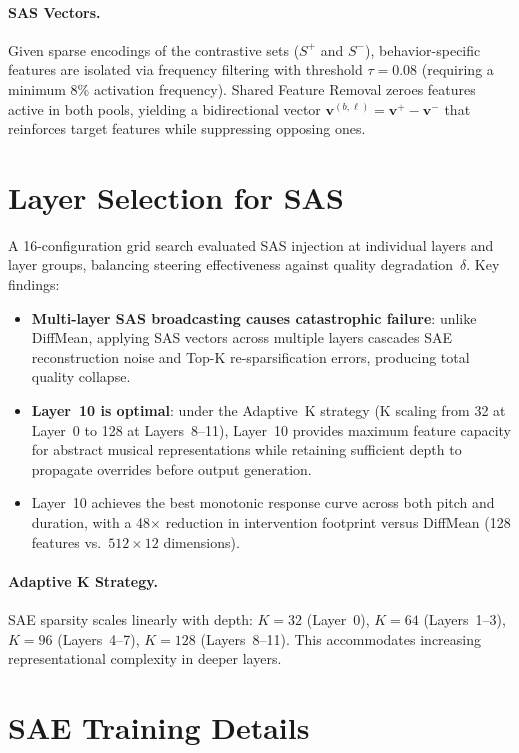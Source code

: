 \documentclass{article}
\theoremstyle{plain}
\begin{document}
\paragraph{SAS Vectors.}
Given sparse encodings of the contrastive sets ($S^+$ and $S^-$), behavior-specific features are isolated via frequency filtering with threshold $\tau{=}0.08$ (requiring a minimum 8\% activation frequency). Shared Feature Removal zeroes features active in both pools, yielding a bidirectional vector $\mathbf{v}^{(b,\ell)} = \mathbf{v}^{+} - \mathbf{v}^{-}$ that reinforces target features while suppressing opposing ones.

\section{Layer Selection for SAS}
\label{app:layer_selection}

A 16-configuration grid search evaluated SAS injection at individual layers and layer groups, balancing steering effectiveness against quality degradation~$\delta$. Key findings:

\begin{itemize}
    \item \textbf{Multi-layer SAS broadcasting causes catastrophic failure}: unlike DiffMean, applying SAS vectors across multiple layers cascades SAE reconstruction noise and Top-K re-sparsification errors, producing total quality collapse.
    \item \textbf{Layer~10 is optimal}: under the Adaptive~K strategy (K scaling from 32 at Layer~0 to 128 at Layers~8--11), Layer~10 provides maximum feature capacity for abstract musical representations while retaining sufficient depth to propagate overrides before output generation.
    \item Layer~10 achieves the best monotonic response curve across both pitch and duration, with a 48$\times$ reduction in intervention footprint versus DiffMean (128 features vs.\ $512{\times}12$ dimensions).
\end{itemize}

\paragraph{Adaptive K Strategy.}
SAE sparsity scales linearly with depth: $K{=}32$ (Layer~0), $K{=}64$ (Layers~1--3), $K{=}96$ (Layers~4--7), $K{=}128$ (Layers~8--11). This accommodates increasing representational complexity in deeper layers.

\section{SAE Training Details}
\label{app:sae_training}
\end{document}
